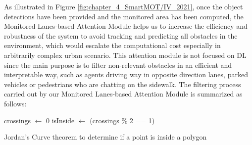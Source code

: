 As illustrated in Figure \ref{fig:chapter_4_SmartMOT/IV_2021}, once the object detections have been provided and the monitored area has been computed, the Monitored Lanes-based Attention Module helps us to increase the efficiency and robustness of the system to avoid tracking and predicting all obstacles in the environment, which would escalate the computational cost especially in arbitrarily complex urban scenario. This attention module is not focused on \ac{DL} since the main purpose is to filter non-relevant obstacles in an efficient and interpretable way, such as agents driving way in opposite direction lanes, parked vehicles or pedestrians who are chatting on the sidewalk. The filtering process carried out by our Monitored Lanes-based Attention Module is summarized as follows:

\begin{algorithm}[h]
	\SetAlgoLined
	crossings $\leftarrow$ 0\;
	isInside $\leftarrow$ (crossings \% 2 == 1)\;
	\;
	\caption{Jordan's Curve theorem to determine if a point is inside a polygon}
	\label{alg:4_jordan_curve_theorem}
\end{algorithm}

